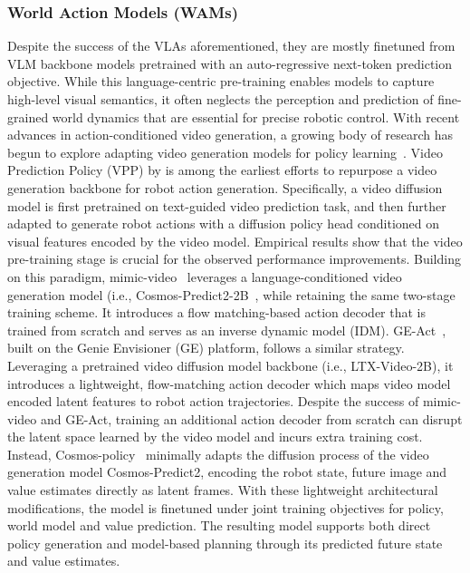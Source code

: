 \documentclass{article}
\begin{document}
\subsubsection{World Action Models (WAMs)}
Despite the success of the VLAs aforementioned, they are mostly finetuned from VLM backbone models pretrained with an auto-regressive next-token prediction objective. While this language-centric pre-training enables models to capture high-level visual semantics, it often neglects the perception and prediction of fine-grained world dynamics that are essential for precise robotic control. With recent advances in action-conditioned video generation, a growing body of research has begun to explore adapting video generation models for policy learning~\citep{bi2025motus, hu2025video, kim2026cosmos, li2026causal, ye2026dreamzero, ye2026gigaworld, yuan2026fast}.  Video Prediction Policy (VPP) by \citet{hu2025video} is among the earliest efforts to repurpose a video generation backbone for robot action generation. Specifically, a video diffusion model is first pretrained on text-guided video prediction task, and then further adapted to generate robot actions with a diffusion policy head conditioned on visual features encoded by the video model. Empirical results show that the video pre-training stage is crucial for the observed performance improvements. Building on this paradigm, mimic-video~\citep{pai2025mimicvideo} leverages a language-conditioned video generation model (i.e., Cosmos-Predict2-2B~\citep{agarwal2025cosmos}, while retaining the same two-stage training scheme. It introduces a flow matching-based action decoder that is trained from scratch and serves as an inverse dynamic model (IDM). 
GE-Act~\citep{liao2025genie}, built on the Genie Envisioner (GE) platform, follows a similar strategy. Leveraging a pretrained video diffusion model backbone (i.e., LTX-Video-2B), it introduces a lightweight, flow-matching action decoder which maps video model encoded latent features to robot action trajectories. 
Despite the success of mimic-video and GE-Act, training an additional action decoder from scratch can disrupt the latent space learned by the video model and incurs extra training cost. Instead, Cosmos-policy~\citep{kim2026cosmos} minimally adapts the diffusion process of the video generation model Cosmos-Predict2, encoding the robot state, future image and value estimates directly as latent frames. With these lightweight architectural modifications, the model is finetuned under joint training objectives for policy, world model and value prediction. The resulting model supports both direct policy generation and model-based planning through its predicted future state and value estimates.  
\end{document}
